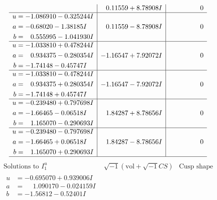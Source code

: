\documentclass[1p]{elsarticle_modified}
\theoremstyle{definition}
\newcommand{\I}{\sqrt{-1}}
\begin{document}
$$\begin{array}{c|c|c}
 & \phantom{-}0.11559 + 8.78908 I & \phantom{-0.000000 } 0 \\ \hline\begin{aligned}
u &= -1.086910 - 0.325244 I \\
a &= -0.68020 - 1.38185 I \\
b &= \phantom{-}0.555995 - 1.041930 I\end{aligned}
 & \phantom{-}0.11559 - 8.78908 I & \phantom{-0.000000 } 0 \\ \hline\begin{aligned}
u &= -1.033810 + 0.478244 I \\
a &= \phantom{-}0.934375 - 0.280354 I \\
b &= -1.74148 - 0.45747 I\end{aligned}
 & -1.16547 + 7.92072 I & \phantom{-0.000000 } 0 \\ \hline\begin{aligned}
u &= -1.033810 - 0.478244 I \\
a &= \phantom{-}0.934375 + 0.280354 I \\
b &= -1.74148 + 0.45747 I\end{aligned}
 & -1.16547 - 7.92072 I & \phantom{-0.000000 } 0 \\ \hline\begin{aligned}
u &= -0.239480 + 0.797698 I \\
a &= -1.66465 - 0.06518 I \\
b &= \phantom{-}1.165070 - 0.290693 I\end{aligned}
 & \phantom{-}1.84287 + 8.78656 I & \phantom{-0.000000 } 0 \\ \hline\begin{aligned}
u &= -0.239480 - 0.797698 I \\
a &= -1.66465 + 0.06518 I \\
b &= \phantom{-}1.165070 + 0.290693 I\end{aligned}
 & \phantom{-}1.84287 - 8.78656 I & \phantom{-0.000000 } 0\\
 \hline 
 \end{array}$$\newpage$$\begin{array}{c|c|c}  
\text{Solutions to }I^u_{1}& \I (\text{vol} + \sqrt{-1}CS) & \text{Cusp shape}\\
 \hline 
\begin{aligned}
u &= -0.695070 + 0.939006 I \\
a &= \phantom{-}1.090170 - 0.024159 I \\
b &= -1.56812 - 0.52401 I\end{aligned}

\end{array}$$
\end{document}
